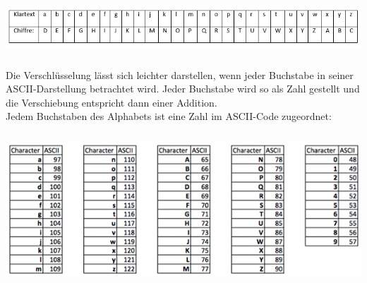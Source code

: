\documentclass[ngerman,12pt]{article}
\begin{document}
\begin{center}
\includegraphics[width=520pt,height=60pt]{Beispiel c=3.png}
\end{center}

Die Verschlüsselung lässt sich leichter darstellen, wenn jeder Buchstabe in seiner ASCII-Darstellung betrachtet wird. Jeder Buchstabe wird so als Zahl gestellt und die Verschiebung entspricht dann einer Addition.\\
Jedem Buchstaben des Alphabets ist eine Zahl im ASCII-Code zugeordnet:

\begin{center}
\includegraphics[width=400pt,height=160pt]{ascii.png}
\end{center}
\end{document}
